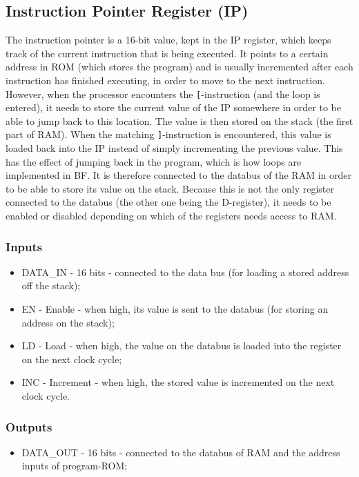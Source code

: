 \subsection{Instruction Pointer Register (IP)} \label{sec:architecture:ip}
The instruction pointer is a 16-bit value, kept in the IP register, which keeps track of the current instruction that is being executed. It points to a certain address in ROM (which stores the program) and is usually incremented after each instruction has finished executing, in order to move to the next instruction. However, when the processor encounters the \texttt{[}-instruction (and the loop is entered), it needs to store the current value of the IP somewhere in order to be able to jump back to this location. The value is then stored on the stack (the first part of RAM). When the matching \texttt{]}-instruction is encountered, this value is loaded back into the IP instead of simply incrementing the previous value. This has the effect of jumping back in the program, which is how loops are implemented in BF. It is therefore connected to the databus of the RAM in order to be able to store its value on the stack. Because this is not the only register connected to the databus (the other one being the D-register), it needs to be enabled or disabled depending on which of the registers needs access to RAM.

\subsubsection*{Inputs}
\begin{itemize}
\item DATA\_IN - 16 bits - connected to the data bus (for loading a stored address off the stack);
\item EN - Enable - when high, its value is sent to the databus (for storing an address on the stack);
\item LD - Load - when high, the value on the databus is loaded into the register on the next clock cycle;
\item INC - Increment - when high, the stored value is incremented on the next clock cycle.
\end{itemize}

\subsubsection*{Outputs}
\begin{itemize}
\item DATA\_OUT - 16 bits - connected to the databus of RAM and the address inputs of program-ROM;
\end{itemize}


